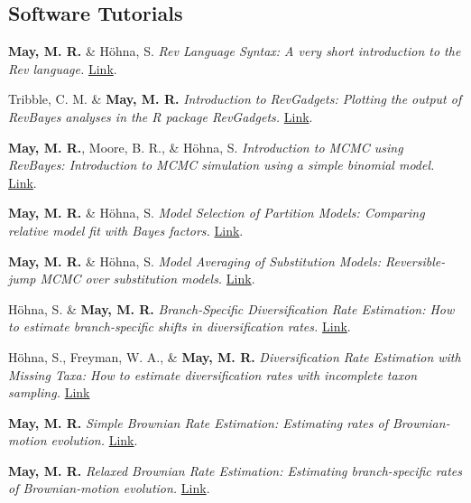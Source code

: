 \subsection*{Software Tutorials}

\begin{etaremune}[topsep=0pt,itemsep=1.2em,partopsep=0pt,parsep=0pt]
    \item \textbf{May, M. R.} \& Höhna, S. \textit{Rev Language Syntax: A very short introduction to the Rev language.} \href{https://revbayes.github.io/tutorials/intro/rev.html}{Link}.
    \item Tribble, C. M. \& \textbf{May, M. R.} \textit{Introduction to RevGadgets: Plotting the output of RevBayes analyses in the R package RevGadgets.} \href{https://revbayes.github.io/tutorials/intro/revgadgets.html}{Link}.
    \item \textbf{May, M. R.}, Moore, B. R., \& Höhna, S. \textit{Introduction to MCMC using RevBayes: Introduction to MCMC simulation using a simple binomial model.} \href{https://revbayes.github.io/tutorials/mcmc/binomial.html}{Link}.
    \item \textbf{May, M. R.} \& Höhna, S. \textit{Model Selection of Partition Models: Comparing relative model fit with Bayes factors.} \href{https://revbayes.github.io/tutorials/model_selection_bayes_factors/bf_partition_model.html}{Link}.
    \item \textbf{May, M. R.} \& Höhna, S. \textit{Model Averaging of Substitution Models: Reversible-jump MCMC over substitution models.} \href{https://revbayes.github.io/tutorials/model_selection_bayes_factors/bf_subst_model_rj.html}{Link}.
    \item Höhna, S. \& \textbf{May, M. R.} \textit{Branch-Specific Diversification Rate Estimation: How to estimate branch-specific shifts in diversification rates.} \href{https://revbayes.github.io/tutorials/divrate/branch_specific.html}{Link}.
    \item Höhna, S., Freyman, W. A., \& \textbf{May, M. R.} \textit{Diversification Rate Estimation with Missing Taxa: How to estimate diversification rates with incomplete taxon sampling.} \href{https://revbayes.github.io/tutorials/divrate/sampling.html}{Link}
    \item \textbf{May, M. R.} \textit{Simple Brownian Rate Estimation: Estimating rates of Brownian-motion evolution.} \href{https://revbayes.github.io/tutorials/cont_traits/simple_bm.html}{Link}.
    \item \textbf{May, M. R.} \textit{Relaxed Brownian Rate Estimation: Estimating branch-specific rates of Brownian-motion evolution.} \href{https://revbayes.github.io/tutorials/cont_traits/relaxed_bm.html}{Link}.

\end{etaremune}
